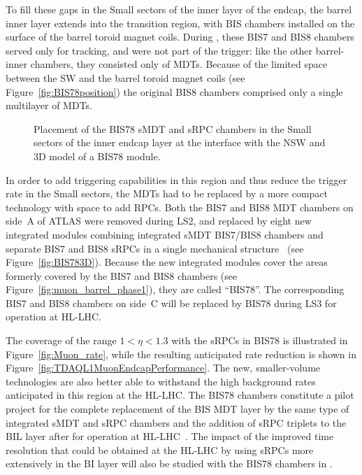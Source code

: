 \documentclass[cernpreprint, atlasdraft=false, UKenglish,british,orcidlogo, texmf, orcidlogo]{atlasdoc}
\begin{document}
To fill these gaps in the Small sectors of the inner layer of the endcap, the barrel inner layer extends into the transition region, with BIS chambers installed on the surface of the barrel toroid magnet coils.
During \RunOneTwo, these BIS7 and BIS8 chambers served only for tracking, and were not part of the trigger: like the other barrel-inner chambers, they consisted only of \glspl{MDT}.
Because of the limited space between the \gls{SW} and the barrel toroid magnet coils (see Figure~\ref{fig:BIS78position}) the original BIS8 chambers comprised only a single multilayer of \glspl{MDT}.
 
\begin{figure}[!h]
\caption{\protect{} Placement of the \gls{BIS78} \gls{sMDT} and \gls{sRPC} chambers
in the Small sectors of the inner endcap layer at the interface with the \gls{NSW} and \protect{} 3D model of a \gls{BIS78} module.}
\end{figure}
 
In order to add triggering capabilities in this region and thus reduce the trigger rate in the Small sectors, the \glspl{MDT} had to be replaced by a more compact technology with space to add \glspl{RPC}.
Both the BIS7 and BIS8 \gls{MDT} chambers on side~A of ATLAS were removed during \gls{LS2}, and replaced by eight new integrated modules combining integrated  \gls{sMDT} BIS7/BIS8 chambers and separate BIS7 and BIS8 \glspl{sRPC} in a single mechanical structure~\cite{ATLAS-TDR-26} (see Figure~\ref{fig:BIS783D}).
Because the new integrated modules cover the areas formerly covered by the BIS7 and BIS8 chambers (see Figure~\ref{fig:muon_barrel_phase1}), they are called ``\gls{BIS78}''.
The corresponding BIS7 and BIS8 chambers on side~C will be replaced by \gls{BIS78} during \gls{LS3} for operation at \gls{HL-LHC}.
 
The coverage of the range $1< \eta <1.3$ 
with the \glspl{sRPC} in \gls{BIS78} is illustrated in Figure~\ref{fig:Muon_rate},
while the resulting anticipated rate reduction
is shown in Figure~\ref{fig:TDAQL1MuonEndcapPerformance}.
The new, smaller-volume technologies are also better able to withstand the high background rates anticipated in this region at the \gls{HL-LHC}.
The \gls{BIS78} chambers constitute a pilot project for the complete replacement of the BIS \gls{MDT} layer by the same type of integrated \gls{sMDT} and \gls{sRPC} chambers and the addition of \gls{sRPC} triplets to the BIL layer after \RunThr for operation at \gls{HL-LHC}~\cite{ATLAS-TDR-26}.
The impact of the improved time resolution that could be obtained at the \gls{HL-LHC} by using \glspl{sRPC} more extensively in the BI layer
will also be studied with the \gls{BIS78} chambers in \RunThr.
 
\end{document}
